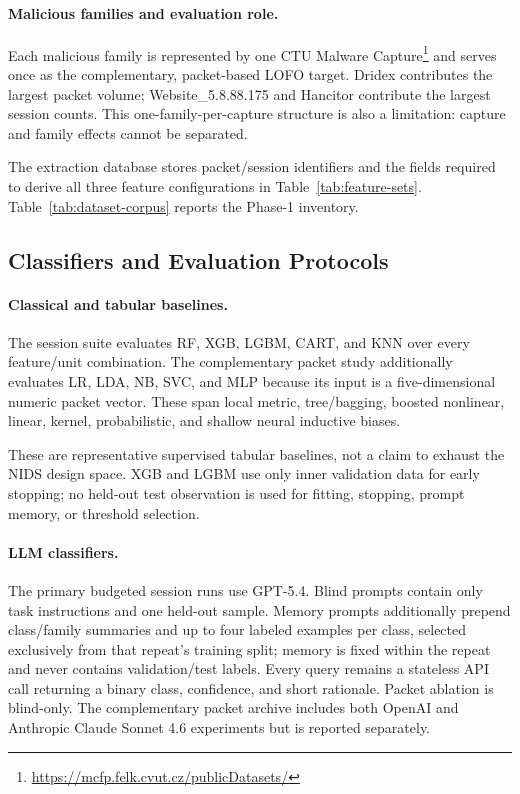\documentclass[letterpaper,twocolumn,10pt]{article}
\begin{document}
\paragraph{Malicious families and evaluation role.}
Each malicious family is represented by one CTU Malware Capture\footnote{\url{https://mcfp.felk.cvut.cz/publicDatasets/}} and serves once as the complementary, packet-based LOFO target. Dridex contributes the largest packet volume; Website\_5.8.88.175 and Hancitor contribute the largest session counts. This one-family-per-capture structure is also a limitation: capture and family effects cannot be separated.

The extraction database stores packet/session identifiers and the fields required to derive all three feature configurations in Table~\ref{tab:feature-sets}. Table~\ref{tab:dataset-corpus} reports the Phase-1 inventory.

\subsection{Classifiers and Evaluation Protocols}

\paragraph{Classical and tabular baselines.}
The session suite evaluates RF, XGB, LGBM, CART, and KNN over every feature/unit combination. The complementary packet study additionally evaluates LR, LDA, NB, SVC, and MLP because its input is a five-dimensional numeric packet vector. These span local metric, tree/bagging, boosted nonlinear, linear, kernel, probabilistic, and shallow neural inductive biases.

These are representative supervised tabular baselines, not a claim to exhaust the NIDS design space. XGB and LGBM use only inner validation data for early stopping; no held-out test observation is used for fitting, stopping, prompt memory, or threshold selection.

\paragraph{LLM classifiers.}
The primary budgeted session runs use GPT-5.4. Blind prompts contain only task instructions and one held-out sample. Memory prompts additionally prepend class/family summaries and up to four labeled examples per class, selected exclusively from that repeat's training split; memory is fixed within the repeat and never contains validation/test labels. Every query remains a stateless API call returning a binary class, confidence, and short rationale. Packet ablation is blind-only. The complementary packet archive includes both OpenAI and Anthropic Claude Sonnet 4.6 experiments but is reported separately.
\end{document}
